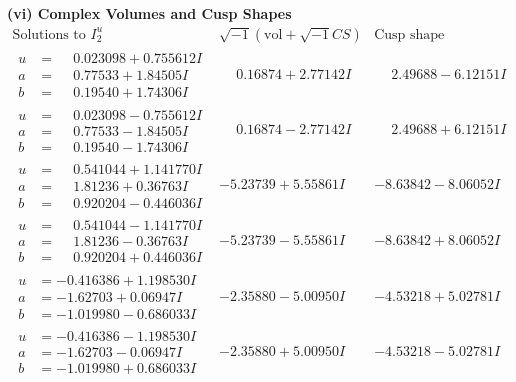\documentclass[1p]{elsarticle_modified}
\theoremstyle{definition}
\newcommand{\I}{\sqrt{-1}}
\begin{document}
\newpage\flushleft \textbf{(vi) Complex Volumes and Cusp Shapes}
$$\begin{array}{c|c|c}  
\text{Solutions to }I^u_{2}& \I (\text{vol} + \sqrt{-1}CS) & \text{Cusp shape}\\
 \hline 
\begin{aligned}
u &= \phantom{-}0.023098 + 0.755612 I \\
a &= \phantom{-}0.77533 + 1.84505 I \\
b &= \phantom{-}0.19540 + 1.74306 I\end{aligned}
 & \phantom{-}0.16874 + 2.77142 I & \phantom{-}2.49688 - 6.12151 I \\ \hline\begin{aligned}
u &= \phantom{-}0.023098 - 0.755612 I \\
a &= \phantom{-}0.77533 - 1.84505 I \\
b &= \phantom{-}0.19540 - 1.74306 I\end{aligned}
 & \phantom{-}0.16874 - 2.77142 I & \phantom{-}2.49688 + 6.12151 I \\ \hline\begin{aligned}
u &= \phantom{-}0.541044 + 1.141770 I \\
a &= \phantom{-}1.81236 + 0.36763 I \\
b &= \phantom{-}0.920204 - 0.446036 I\end{aligned}
 & -5.23739 + 5.55861 I & -8.63842 - 8.06052 I \\ \hline\begin{aligned}
u &= \phantom{-}0.541044 - 1.141770 I \\
a &= \phantom{-}1.81236 - 0.36763 I \\
b &= \phantom{-}0.920204 + 0.446036 I\end{aligned}
 & -5.23739 - 5.55861 I & -8.63842 + 8.06052 I \\ \hline\begin{aligned}
u &= -0.416386 + 1.198530 I \\
a &= -1.62703 + 0.06947 I \\
b &= -1.019980 - 0.686033 I\end{aligned}
 & -2.35880 - 5.00950 I & -4.53218 + 5.02781 I \\ \hline\begin{aligned}
u &= -0.416386 - 1.198530 I \\
a &= -1.62703 - 0.06947 I \\
b &= -1.019980 + 0.686033 I\end{aligned}
 & -2.35880 + 5.00950 I & -4.53218 - 5.02781 I \\ \hline\begin{aligned}

\end{aligned}
\end{array}$$
\end{document}
